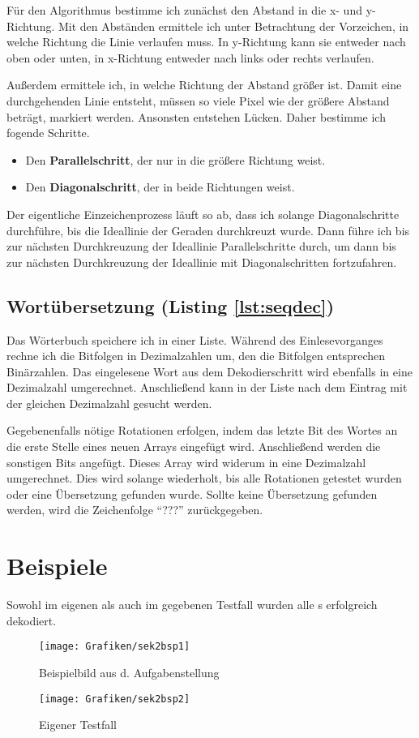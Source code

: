 Für den Algorithmus bestimme ich zunächst den Abstand in die x- und y-Richtung. Mit den Abständen ermittele ich unter Betrachtung der Vorzeichen, in welche Richtung die Linie verlaufen muss. In y-Richtung kann sie entweder nach oben oder unten, in x-Richtung entweder nach links oder rechts verlaufen.

Außerdem ermittele ich, in welche Richtung der Abstand größer ist.
Damit eine durchgehenden Linie entsteht, müssen so viele Pixel wie der größere Abstand beträgt, markiert werden. Ansonsten entstehen Lücken. Daher bestimme ich fogende Schritte.
\begin{itemize}
	\item Den \textbf{Parallelschritt}, der nur in die größere Richtung weist. 
	\item Den \textbf{Diagonalschritt}, der in beide Richtungen weist.
\end{itemize}

Der eigentliche Einzeichenprozess läuft so ab, dass ich solange Diagonalschritte durchführe, bis die Ideallinie der Geraden durchkreuzt wurde. Dann führe ich bis zur nächsten Durchkreuzung der Ideallinie Parallelschritte durch, um dann bis zur nächsten Durchkreuzung der Ideallinie mit Diagonalschritten fortzufahren.

\subsection{Wortübersetzung (Listing \ref{lst:seqdec})}
Das Wörterbuch speichere ich in einer Liste. Während des Einlesevorganges rechne ich die Bitfolgen in Dezimalzahlen um, den die Bitfolgen entsprechen Binärzahlen.
Das eingelesene Wort aus dem Dekodierschritt wird ebenfalls in eine Dezimalzahl umgerechnet. Anschließend kann in der Liste nach dem Eintrag mit der gleichen Dezimalzahl gesucht werden.

Gegebenenfalls nötige Rotationen erfolgen, indem das letzte Bit des Wortes an die erste Stelle eines neuen Arrays eingefügt wird. Anschließend werden die sonstigen Bits angefügt.
Dieses Array wird widerum in eine Dezimalzahl umgerechnet. Dies wird solange wiederholt, bis alle Rotationen getestet wurden oder eine Übersetzung gefunden wurde.
Sollte keine Übersetzung gefunden werden, wird die Zeichenfolge "`???"' zurückgegeben. 

\pagebreak
\section{Beispiele}
Sowohl im eigenen als auch im gegebenen Testfall wurden alle \task{}s erfolgreich dekodiert.
\begin{figure}[!ht]
	\centering	
	\texttt{[image: Grafiken/sek2bsp1]}
	\caption{Beispielbild aus d. Aufgabenstellung}
\end{figure}
\vfill{}
\begin{figure}[!ht]
	\centering	
	\texttt{[image: Grafiken/sek2bsp2]}
	\caption{Eigener Testfall}
\end{figure}
